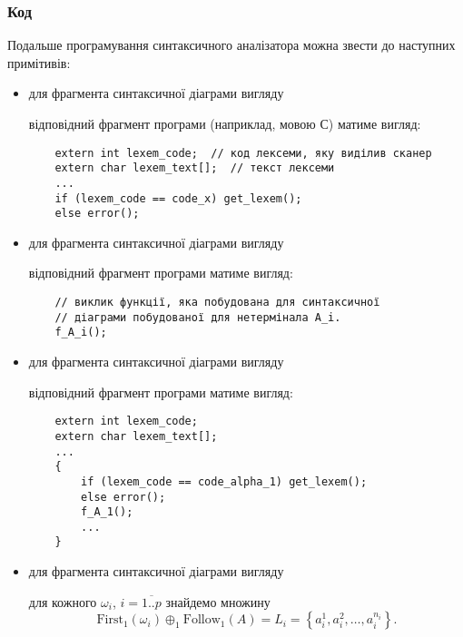 \subsubsection{Код}

Подальше програмування синтаксичного аналізатора можна звести до наступних примітивів:
\begin{itemize}
	\item для фрагмента синтаксичної діаграми вигляду 
	\begin{figure}[H]
		\centering
		
	\end{figure}
	відповідний фрагмент програми (наприклад, мовою С) матиме вигляд:
	\begin{verbatim}
	extern int lexem_code;  // код лексеми, яку виділив сканер
	extern char lexem_text[];  // текст лексеми
	...
	if (lexem_code == code_x) get_lexem();
	else error();
	\end{verbatim}

	\item для фрагмента синтаксичної діаграми вигляду
	\begin{figure}[H]
		\centering
		
	\end{figure}
	відповідний фрагмент програми матиме вигляд:
	\begin{verbatim}
	// виклик функції, яка побудована для синтаксичної 
	// діаграми побудованої для нетермінала A_i.
	f_A_i();
	\end{verbatim}
	\item для фрагмента синтаксичної діаграми вигляду
	\begin{figure}[H]
		\centering
		
	\end{figure}
	відповідний фрагмент програми матиме вигляд:
	\begin{verbatim}
	extern int lexem_code;
	extern char lexem_text[];
	...
	{
	    if (lexem_code == code_alpha_1) get_lexem();
	    else error();
	    f_A_1();
	    ...
	}
	\end{verbatim}
	\item для фрагмента синтаксичної діаграми вигляду
	\begin{figure}[H]
		\centering
		
	\end{figure}
	для кожного $\omega_i$, $i = \overline{1..p}$ знайдемо множину
	\begin{equation}
	    \text{First}_1(\omega_i) \oplus_1 \text{Follow}_1(A) = L_i = \left\{a_i^1, a_i^2, \ldots, a_i^{n_i}\right\}.
	\end{equation}


\end{itemize}
